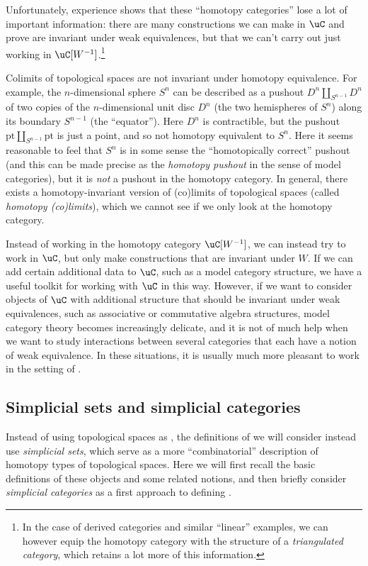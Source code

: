 \documentclass[a4paper,12pt]{article}
\begin{document}
Unfortunately, experience shows that these ``homotopy categories''
lose a lot of important information: there are many constructions we can
make in $\uC$ and prove are invariant under weak equivalences, but
that we can't carry out just working in $\uC[W^{-1}]$.\footnote{In the
  case of derived categories and similar ``linear'' examples, we can
  however equip the homotopy category with the structure of a
  \emph{triangulated category}, which retains a lot more of this
  information.} 
\begin{ex}
  Colimits of topological spaces are not invariant under homotopy
  equivalence. For example, the $n$-dimensional sphere $S^{n}$ can be
  described as a pushout $D^{n} \amalg_{S^{n-1}} D^{n}$ of two copies
  of the $n$-dimensional unit disc $D^{n}$ (the two hemispheres of
  $S^{n}$) along its boundary $S^{n-1}$ (the ``equator''). Here
  $D^{n}$ is contractible, but the pushout
  $\mathrm{pt} \amalg_{S^{n-1}} \mathrm{pt}$ is just a point, and so
  not homotopy equivalent to $S^{n}$. Here it seems reasonable to feel
  that $S^{n}$ is in some sense the ``homotopically correct'' pushout
  (and this can be made precise as the \emph{homotopy pushout} in the
  sense of model categories), but it is \emph{not} a pushout in the
  homotopy category. In general, there exists a homotopy-invariant
  version of (co)limits of topological spaces (called \emph{homotopy
    (co)limits}), which we cannot see if we only look at the homotopy
  category.
\end{ex}

Instead of working in the homotopy category $\uC[W^{-1}]$, we can
instead try to work in $\uC$, but only make constructions that are
invariant under $W$. If we can add certain additional data to $\uC$,
such as a model category structure, we have a useful toolkit for
working with $\uC$ in this way. However, if we want to consider
objects of $\uC$ with additional structure that should be invariant
under weak equivalences, such as associative or commutative algebra
structures, model category theory becomes increasingly delicate, and
it is not of much help when we want to study interactions between
several categories that each have a notion of weak equivalence. In
these situations, it is usually much more pleasant to work in the
setting of \icats{}.

\subsection{Simplicial sets and simplicial categories}\label{subsec:simp}
Instead of using topological spaces as \igpds{}, the definitions of
\icats{} we will consider instead use \emph{simplicial sets}, which serve
as a more ``combinatorial'' description of homotopy types of
topological spaces. Here we will first recall the basic definitions of
these objects and some related notions, and then briefly consider
\emph{simplicial categories} as a first approach to defining \icats{}.
\end{document}
